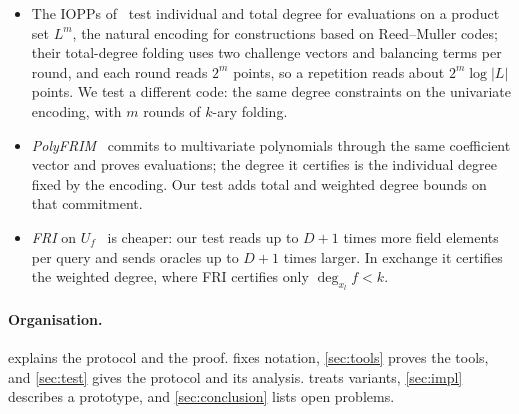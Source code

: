 \begin{itemize}
\item The IOPPs of~\cite{ABN23} test individual and total degree for
evaluations on a product set $L^m$, the natural encoding for constructions based on
Reed--Muller codes; their total-degree folding uses two challenge vectors and balancing
terms per round, and each round reads $2^m$ points, so a repetition reads about
$2^m\log|L|$ points. We test a different code: the same
degree constraints on the univariate encoding, with $m$ rounds of $k$-ary folding.
\item \emph{PolyFRIM}~\cite{PolyFRIM} commits to multivariate polynomials through the same
coefficient vector and proves evaluations; the degree it certifies is the individual degree
fixed by the encoding. Our test adds total and weighted degree bounds on that commitment.
\item \emph{FRI} on $U_f$~\cite{BBHR18,BCIKS20} is cheaper: our test reads up to $D+1$ times
more field elements per query and sends oracles up to $D+1$ times larger. In exchange it
certifies the weighted degree, where FRI certifies only $\deg_{x_l}f<k$.
\end{itemize}

\paragraph{Organisation.}  explains the protocol and the proof.
 fixes notation, \cref{sec:tools} proves the tools, and \cref{sec:test}
gives the protocol and its analysis.  treats variants,
\cref{sec:impl} describes a prototype, and \cref{sec:conclusion} lists open problems.
